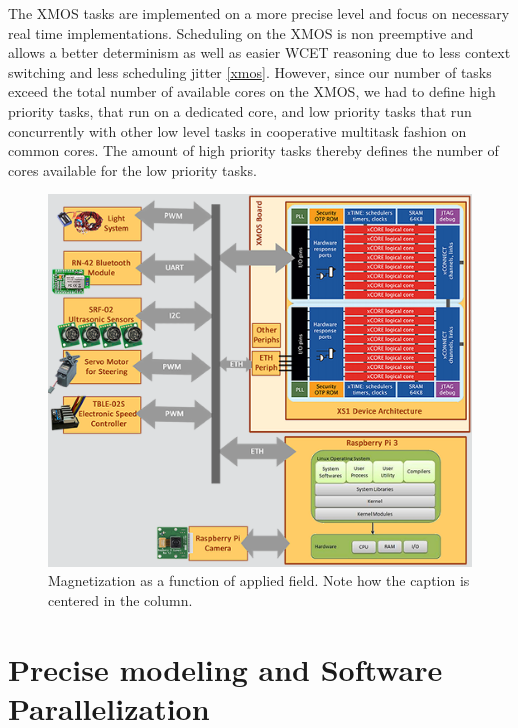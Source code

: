 \documentclass [a4paper,final,conference,10pt]{IDAACS}
\begin{document}
The XMOS tasks are implemented on a more precise level and focus on necessary real time implementations. Scheduling on the XMOS is non preemptive and allows a better determinism as well as easier WCET reasoning due to less context switching and less scheduling jitter \ref{xmos}. However, since our number of tasks exceed the total number of available cores on the XMOS, we had to define high priority tasks, that run on a dedicated core, and low priority tasks that run concurrently with other low level tasks in cooperative multitask fashion on common cores. The amount of high priority tasks thereby defines the number of cores available for the low priority tasks. 

\begin{figure}[bth]
\centering
\includegraphics[scale=0.15]{images/hwarch.png}
\caption{\label{Fig_Magnet}Magnetization as a function of applied field. Note 
how the caption is centered in the column.}
\end{figure}


\section{Precise modeling and Software Parallelization}
\label{sec:impl}
\end{document}
